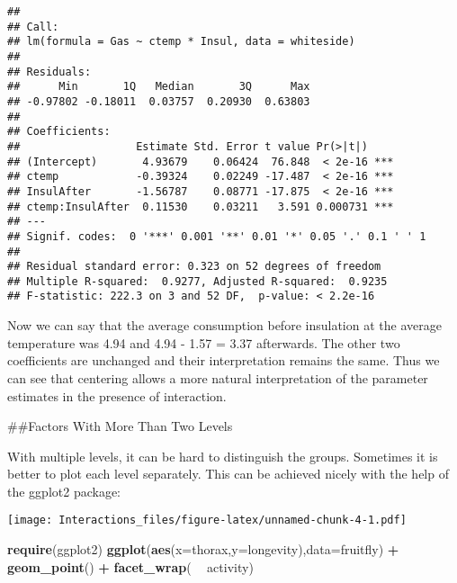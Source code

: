 \documentclass[
]{article}
\newenvironment{Shaded}{\begin{snugshade}}{\end{snugshade}}
\newcommand{\DataTypeTok}[1]{\textcolor[rgb]{0.13,0.29,0.53}{#1}}
\newcommand{\DecValTok}[1]{\textcolor[rgb]{0.00,0.00,0.81}{#1}}
\newcommand{\FloatTok}[1]{\textcolor[rgb]{0.00,0.00,0.81}{#1}}
\newcommand{\KeywordTok}[1]{\textcolor[rgb]{0.13,0.29,0.53}{\textbf{#1}}}
\newcommand{\NormalTok}[1]{#1}
\newcommand{\OperatorTok}[1]{\textcolor[rgb]{0.81,0.36,0.00}{\textbf{#1}}}
\newcommand{\StringTok}[1]{\textcolor[rgb]{0.31,0.60,0.02}{#1}}
\begin{document}
\begin{verbatim}
## 
## Call:
## lm(formula = Gas ~ ctemp * Insul, data = whiteside)
## 
## Residuals:
##      Min       1Q   Median       3Q      Max 
## -0.97802 -0.18011  0.03757  0.20930  0.63803 
## 
## Coefficients:
##                  Estimate Std. Error t value Pr(>|t|)    
## (Intercept)       4.93679    0.06424  76.848  < 2e-16 ***
## ctemp            -0.39324    0.02249 -17.487  < 2e-16 ***
## InsulAfter       -1.56787    0.08771 -17.875  < 2e-16 ***
## ctemp:InsulAfter  0.11530    0.03211   3.591 0.000731 ***
## ---
## Signif. codes:  0 '***' 0.001 '**' 0.01 '*' 0.05 '.' 0.1 ' ' 1
## 
## Residual standard error: 0.323 on 52 degrees of freedom
## Multiple R-squared:  0.9277, Adjusted R-squared:  0.9235 
## F-statistic: 222.3 on 3 and 52 DF,  p-value: < 2.2e-16
\end{verbatim}

Now we can say that the average consumption before insulation at the
average temperature was 4.94 and 4.94 - 1.57 = 3.37 afterwards. The
other two coefficients are unchanged and their interpretation remains
the same. Thus we can see that centering allows a more natural
interpretation of the parameter estimates in the presence of
interaction.

\#\#Factors With More Than Two Levels

With multiple levels, it can be hard to distinguish the groups.
Sometimes it is better to plot each level separately. This can be
achieved nicely with the help of the ggplot2 package:

\begin{Shaded}
\end{Shaded}

\texttt{[image: Interactions\_files/figure-latex/unnamed-chunk-4-1.pdf]}

\begin{Shaded}
\begin{Highlighting}[]
\KeywordTok{require}\NormalTok{(ggplot2)}
\KeywordTok{ggplot}\NormalTok{(}\KeywordTok{aes}\NormalTok{(}\DataTypeTok{x=}\NormalTok{thorax,}\DataTypeTok{y=}\NormalTok{longevity),}\DataTypeTok{data=}\NormalTok{fruitfly) }\OperatorTok{+}\StringTok{ }\KeywordTok{geom_point}\NormalTok{() }\OperatorTok{+}\StringTok{ }\KeywordTok{facet_wrap}\NormalTok{( }\OperatorTok{~}\StringTok{ }\NormalTok{activity)}
\end{Highlighting}
\end{Shaded}
\end{document}
